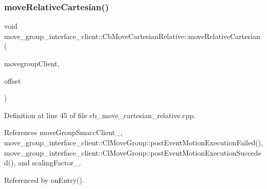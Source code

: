 \subsubsection{\texorpdfstring{move\+Relative\+Cartesian()}{moveRelativeCartesian()}}
{\footnotesize\ttfamily void move\+\_\+group\+\_\+interface\+\_\+client\+::\+Cb\+Move\+Cartesian\+Relative\+::move\+Relative\+Cartesian (\begin{DoxyParamCaption}\item[{moveit\+::planning\+\_\+interface\+::\+Move\+Group\+Interface $\ast$}]{movegroup\+Client,  }\item[{geometry\+\_\+msgs\+::\+Vector3 \&}]{offset }\end{DoxyParamCaption})}



Definition at line 45 of file cb\+\_\+move\+\_\+cartesian\+\_\+relative.\+cpp.



References move\+Group\+Smacc\+Client\+\_\+, move\+\_\+group\+\_\+interface\+\_\+client\+::\+Cl\+Move\+Group\+::post\+Event\+Motion\+Execution\+Failed(), move\+\_\+group\+\_\+interface\+\_\+client\+::\+Cl\+Move\+Group\+::post\+Event\+Motion\+Execution\+Succeded(), and scaling\+Factor\+\_\+.



Referenced by on\+Entry().


